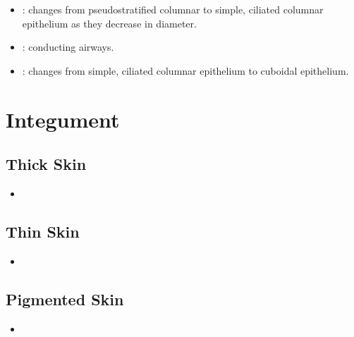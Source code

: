 \begin{multicols}{2}
\begin{itemize}
  \item {}: changes from pseudostratified columnar to simple, ciliated columnar epithelium as they decrease in diameter.
  
  \begin{center}
  \end{center}
  
  \item {}: conducting airways.
  
  \begin{center}
  \end{center}
  
  \item {}: changes from simple, ciliated columnar epithelium to cuboidal epithelium.
  
  \begin{center}
  \end{center}
  
\end{itemize}
\end{multicols}


\newpage
\section{Integument}

\subsection{Thick Skin}
\begin{multicols}{2}
\begin{itemize}
  \item 
\end{itemize}
\end{multicols}

\subsection{Thin Skin}
\begin{multicols}{2}
\begin{itemize}
  \item 
\end{itemize}
\end{multicols}

\subsection{Pigmented Skin}
\begin{multicols}{2}
\begin{itemize}
  \item 
\end{itemize}
\end{multicols}

